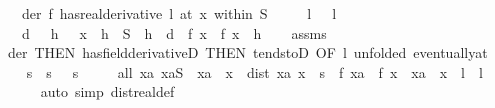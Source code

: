 \begin{isabellebody}
\ \ \ der{\isacharcolon}{\kern0pt}\ {\isachardoublequoteopen}{\isacharparenleft}{\kern0pt}f\ has{\isacharunderscore}{\kern0pt}real{\isacharunderscore}{\kern0pt}derivative\ l{\isacharparenright}{\kern0pt}\ {\isacharparenleft}{\kern0pt}at\ x\ within\ S{\isacharparenright}{\kern0pt}{\isachardoublequoteclose}\isanewline
\ \ \ \ \ l{\isacharcolon}{\kern0pt}\ {\isachardoublequoteopen}{}\ {\isacharless}{\kern0pt}\ l{\isachardoublequoteclose}\isanewline
\ \ \ {\isachardoublequoteopen}{\isasymexists}d\ {\isachargreater}{\kern0pt}\ {}{\isachardot}{\kern0pt}\ {\isasymforall}h\ {\isachargreater}{\kern0pt}\ {}{\isachardot}{\kern0pt}\ x\ {\isacharplus}{\kern0pt}\ h\ {\isasymin}\ S\ {\isasymlongrightarrow}\ h\ {\isacharless}{\kern0pt}\ d\ {\isasymlongrightarrow}\ f\ x\ {\isacharless}{\kern0pt}\ f\ {\isacharparenleft}{\kern0pt}x\ {\isacharplus}{\kern0pt}\ h{\isacharparenright}{\kern0pt}{\isachardoublequoteclose}\isanewline
%
\isadelimproof
\ \ %
\endisadelimproof
%
\isatagproof
{}\isamarkupfalse%
\ assms\isanewline
{}\isamarkupfalse%
\ {\isacharminus}{\kern0pt}\isanewline
\ \ \isamarkupfalse%
\ der\ {\isacharbrackleft}{\kern0pt}THEN\ has{\isacharunderscore}{\kern0pt}field{\isacharunderscore}{\kern0pt}derivativeD{\isacharcomma}{\kern0pt}\ THEN\ tendstoD{\isacharcomma}{\kern0pt}\ OF\ l{\isacharcomma}{\kern0pt}\ unfolded\ eventually{\isacharunderscore}{\kern0pt}at{\isacharbrackright}{\kern0pt}\isanewline
\ \ \isamarkupfalse%
\ s\ \ s{\isacharcolon}{\kern0pt}\ {\isachardoublequoteopen}{}\ {\isacharless}{\kern0pt}\ s{\isachardoublequoteclose}\isanewline
\ \ \ \ \ all{\isacharcolon}{\kern0pt}\ {\isachardoublequoteopen}{\isasymAnd}xa{\isachardot}{\kern0pt}\ xa{\isasymin}S\ {\isasymLongrightarrow}\ xa\ {\isasymnoteq}\ x\ {\isasymand}\ dist\ xa\ x\ {\isacharless}{\kern0pt}\ s\ {\isasymlongrightarrow}\ {\isasymbar}{\isacharparenleft}{\kern0pt}f\ xa\ {\isacharminus}{\kern0pt}\ f\ x{\isacharparenright}{\kern0pt}\ {\isacharslash}{\kern0pt}\ {\isacharparenleft}{\kern0pt}xa\ {\isacharminus}{\kern0pt}\ x{\isacharparenright}{\kern0pt}\ {\isacharminus}{\kern0pt}\ l{\isasymbar}\ {\isacharless}{\kern0pt}\ l{\isachardoublequoteclose}\isanewline
\ \ \ \ \isamarkupfalse%
\ {\isacharparenleft}{\kern0pt}auto\ simp{\isacharcolon}{\kern0pt}\ dist{\isacharunderscore}{\kern0pt}real{\isacharunderscore}{\kern0pt}def{\isacharparenright}{\kern0pt}\isanewline
\ \ \isamarkupfalse%

\end{isabellebody}
